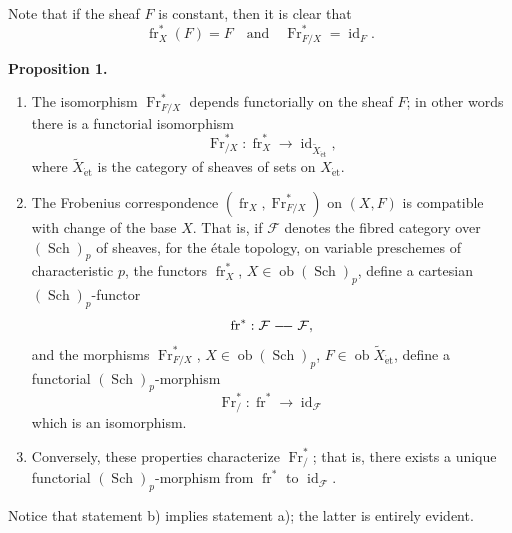 \documentclass[11pt]{article}
\newenvironment{statement}[1]{\par\medskip\noindent\textbf{#1.}\ }{\par\medskip}
\providecommand{\et}{\mathrm{\acute{e}t}}
\providecommand{\id}{\operatorname{id}}
\providecommand{\Ob}{\operatorname{ob}}
\providecommand{\id}{\operatorname{id}}
\providecommand{\id}{\operatorname{id}}
\providecommand{\Ob}{\operatorname{ob}}
\providecommand{\id}{\operatorname{id}}
\providecommand{\id}{\operatorname{id}}
\providecommand{\Ob}{\operatorname{Ob}}
\providecommand{\Ob}{\operatorname{ob}}
\providecommand{\fr}{\operatorname{fr}}
\providecommand{\Fr}{\operatorname{Fr}}
\providecommand{\Sch}{\operatorname{Sch}}
\providecommand{\Fr}{\operatorname{Fr}}
\providecommand{\fr}{\operatorname{fr}}
\providecommand{\Sch}{\operatorname{Sch}}
\providecommand{\id}{\operatorname{id}}
\providecommand{\Ob}{\operatorname{Ob}}
\providecommand{\et}{\acute{e}t}
\begin{document}
Note that if the sheaf $F$ is constant, then it is clear that
\[
\fr_X^*(F)=F
\quad\text{and}\quad
\Fr^*_{F/X}=\id_F.
\]

\begin{statement}{Proposition 1}
\begin{enumerate}[label=\alph*)]
\item The isomorphism $\Fr^*_{F/X}$ depends functorially on the sheaf $F$; in other words there is a functorial isomorphism
\[
\Fr^*_{/X}:\fr_X^*\longrightarrow \id_{\widetilde X_{\et}},
\]
where $\widetilde X_{\et}$ is the category of sheaves of sets on $X_{\et}$.
\item The Frobenius correspondence $(\fr_X,\Fr^*_{F/X})$ on $(X,F)$ is compatible with change of the base $X$. That is, if $\mathcal F$ denotes the fibred category over $(\Sch)_p$ of sheaves, for the étale topology, on variable preschemes of characteristic $p$, the functors $\fr_X^*$, $X\in\Ob(\Sch)_p$, define a cartesian $(\Sch)_p$-functor
\[
\fr^*: \mathcal F\relbar\joinrel\relbar\mathcal F,
\]
and the morphisms $\Fr^*_{F/X}$, $X\in\Ob(\Sch)_p$, $F\in\Ob\widetilde X_{\et}$, define a functorial $(\Sch)_p$-morphism
\[
\Fr^*_{/}:\fr^*\longrightarrow\id_{\mathcal F}
\]
which is an isomorphism.
\item Conversely, these properties characterize $\Fr^*_{/}$; that is, there exists a unique functorial $(\Sch)_p$-morphism from $\fr^*$ to $\id_{\mathcal F}$.
\end{enumerate}
\end{statement}

Notice that statement b) implies statement a); the latter is entirely evident.
\end{document}
